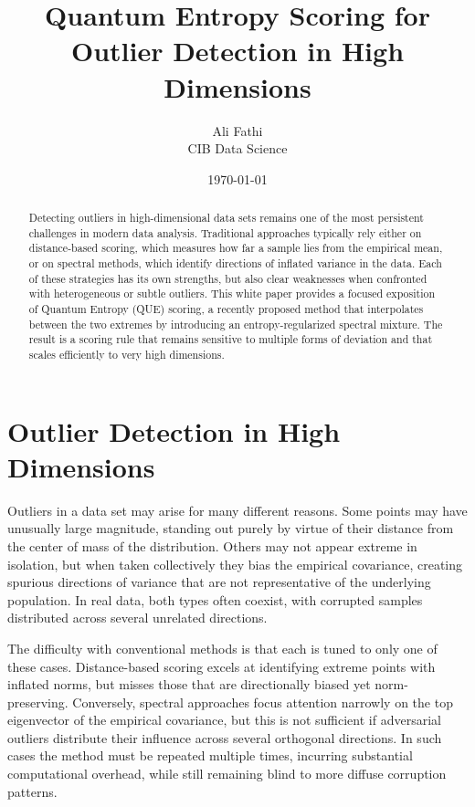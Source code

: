 \documentclass[11pt]{article}
\title{Quantum Entropy Scoring for Outlier Detection in High Dimensions}
\author{Ali Fathi \\ CIB Data Science}
\date{\today}
\begin{document}
\maketitle

\begin{abstract}
Detecting outliers in high-dimensional data sets remains one of the most persistent challenges in modern data analysis. Traditional approaches typically rely either on distance-based scoring, which measures how far a sample lies from the empirical mean, or on spectral methods, which identify directions of inflated variance in the data. Each of these strategies has its own strengths, but also clear weaknesses when confronted with heterogeneous or subtle outliers. This white paper provides a focused exposition of Quantum Entropy (QUE) scoring, a recently proposed method that interpolates between the two extremes by introducing an entropy-regularized spectral mixture. The result is a scoring rule that remains sensitive to multiple forms of deviation and that scales efficiently to very high dimensions.
\end{abstract}

\section{Outlier Detection in High Dimensions}
Outliers in a data set may arise for many different reasons. Some points may have unusually large magnitude, standing out purely by virtue of their distance from the center of mass of the distribution. Others may not appear extreme in isolation, but when taken collectively they bias the empirical covariance, creating spurious directions of variance that are not representative of the underlying population. In real data, both types often coexist, with corrupted samples distributed across several unrelated directions.

The difficulty with conventional methods is that each is tuned to only one of these cases. Distance-based scoring excels at identifying extreme points with inflated norms, but misses those that are directionally biased yet norm-preserving. Conversely, spectral approaches focus attention narrowly on the top eigenvector of the empirical covariance, but this is not sufficient if adversarial outliers distribute their influence across several orthogonal directions. In such cases the method must be repeated multiple times, incurring substantial computational overhead, while still remaining blind to more diffuse corruption patterns.
\end{document}
